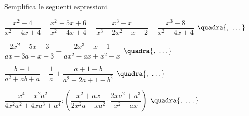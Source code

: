 \begin{esercizio}
Semplifica le seguenti espressioni.
\begin{enumeratea}
 \item \(\dfrac{x^{2}-4}{x^{2}-4x+4}-\dfrac{x^{2}-5x+6}{x^{2}-4x+4}+
        \dfrac{x^{3}-x}{x^{3}-2x^{2}-x+2}-\dfrac{x^{3}-8}{x^{2}-4x+4}\)
  \hfill {\footnotesize \(\quadra{,~\dots}\)}
 \item \(\dfrac{2x^{2}-5x-3}{ax-3a+x-3}-\dfrac{2x^{3}-x-1}{ax^{2}-ax+x^{2}-x}\)
  \hfill {\footnotesize \(\quadra{,~\dots}\)}
 \item \(\dfrac{b+1}{a^{2}+ab+a}-\dfrac{1}{a}+\dfrac{a+1-b}{a^{2}+2a+1-b^{2}}\)
  \hfill {\footnotesize \(\quadra{,~\dots}\)}
 \item \(\dfrac{x^{4}-x^{2}a^{2}}{4x^{2}a^{2}+4xa^{3}+a^{4}}:
        \left(\dfrac{x^{2}+ax}{2x^{2}a+xa^{2}}\cdot
             {\dfrac{2xa^{2}+a^{3}}{x^{2}-ax}}\right)\)
  \hfill {\footnotesize \(\quadra{,~\dots}\)}
\end{enumeratea}
\end{esercizio}

